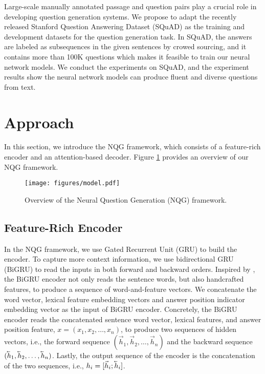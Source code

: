 \documentclass[11pt,letterpaper]{article}
\newcommand{\cev}[1]{\reflectbox{\ensuremath{\vec{\reflectbox{\ensuremath{#1}}}}}}
\newcommand{\ourModelName}{NQG}
\begin{document}
Large-scale manually annotated passage and question pairs play a crucial role in developing question generation systems.
We propose to adapt the recently released Stanford Question Answering Dataset (SQuAD) \citep{rajpurkar2016squad} as the training and development datasets for the question generation task.
In SQuAD, the answers are labeled as subsequences in the given sentences by crowed sourcing, and it contains more than 100K questions which makes it feasible to train our neural network models.
We conduct the experiments on SQuAD, and the experiment results show the neural network models can produce fluent and diverse questions from text.
 

\section{Approach}
In this section, we introduce the \ourModelName{} framework, which consists of a feature-rich encoder and an attention-based decoder.
Figure \ref{fig:model} provides an overview of our \ourModelName{} framework.

\begin{figure}[ht]
	\centering
	\texttt{[image: figures/model.pdf]}
	\caption{\label{fig:model}Overview of the Neural Question Generation (\ourModelName{}) framework.
	}
\end{figure}



\subsection{Feature-Rich Encoder}
In the \ourModelName{} framework, we use Gated Recurrent Unit (GRU) \cite{cho-EtAl:2014:EMNLP2014} to build the encoder.
To capture more context information, we use bidirectional GRU (BiGRU) to read the inputs in both forward and backward orders.
Inspired by \citet{chen-manning:2014:EMNLP2014,nallapatiabstractive}, the BiGRU encoder not only reads the sentence words, but also handcrafted features, to produce a sequence of word-and-feature vectors.
We concatenate the word vector, lexical feature embedding vectors and answer position indicator embedding vector as the input of BiGRU encoder.
Concretely, the BiGRU encoder reads the concatenated sentence word vector, lexical features, and answer position feature, $ x = (x_{1}, x_{2}, \dots, x_{n}) $, to produce two sequences of hidden vectors, i.e., the forward sequence $ (\vec{h}_{1}, \vec{h}_{2}, \dots, \vec{h}_{n})  $ and the backward sequence $ (\cev{h}_{1}, \cev{h}_{2}, \dots, \cev{h}_{n}) $.
Lastly, the output sequence of the encoder is the concatenation of the two sequences, i.e., $ h_{i} = [\vec{h}_{i} ; \cev{h}_{i}] $.
\end{document}
